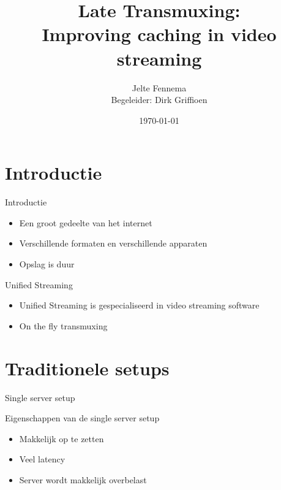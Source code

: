 \documentclass[xcolor=svgnames]{beamer}
\title[Late Transmuxing\hspace{2em}]{Late Transmuxing:\\Improving caching in video streaming}
\author[Jelte Fennema]{Jelte Fennema\\\footnotesize{Begeleider: Dirk Griffioen}}
\date{\today}
\institute{Universiteit van Amsterdam\and Unified Streaming}
\begin{document}
\maketitle

\section{Introductie}

\begin{frame}{Introductie}
  \begin{itemize}
      \item Een groot gedeelte van het internet
      \item Verschillende formaten en verschillende apparaten
      \item Opslag is duur
  \end{itemize}
\end{frame}

\begin{frame}{Unified Streaming}
  \begin{itemize}
      \item Unified Streaming is gespecialiseerd in video streaming software
      \item On the fly transmuxing
  \end{itemize}
\end{frame}

\section{Traditionele setups}

\begin{frame}{Single server setup}
    \begin{figure}

        \resizebox{\textwidth}{!}{%
            
        }
    \end{figure}
\end{frame}
\begin{frame}{Eigenschappen van de single server setup}
    \begin{itemize}
        \item Makkelijk op te zetten

        \item Veel latency

        \item Server wordt makkelijk overbelast

    \end{itemize}
\end{frame}
\end{document}
